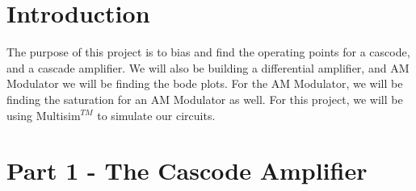 \documentclass[12pt]{article}
\begin{document}
\pagebreak
{}
\tableofcontents
\pagebreak
\listoffigures
\listoftables
\pagebreak
{}


\section*{Introduction}
The purpose of this project is to bias and find the operating points for a cascode, and a cascade amplifier. We will also be building a differential amplifier, and AM Modulator we will be finding the bode plots. For the AM Modulator, we will be finding the saturation for an AM Modulator as well.  For this project, we will be using Multisim$^{TM}$ to simulate our circuits.

\section{Part 1 - The Cascode Amplifier}
\end{document}
